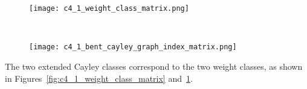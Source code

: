 \documentclass[12pt,a4paper]{article}
\begin{document}
%

\begin{figure}[!bhpt] %
\centering
\begin{minipage}{.48\textwidth}
  \centering
  \texttt{[image: c4\_1\_weight\_class\_matrix.png]}
  \label{fig:c4_1_weight_class_matrix}
\end{minipage}%
~~~~
\begin{minipage}{.48\textwidth}
  \centering
  \texttt{[image: c4\_1\_bent\_cayley\_graph\_index\_matrix.png]}
  \label{fig:c4_1_bent_cayley_graph_index_matrix}
\end{minipage}
\end{figure}
The two extended Cayley classes correspond to the two weight classes,
as shown in Figures~\ref{fig:c4_1_weight_class_matrix} and~\ref{fig:c4_1_bent_cayley_graph_index_matrix}.
\end{document}
